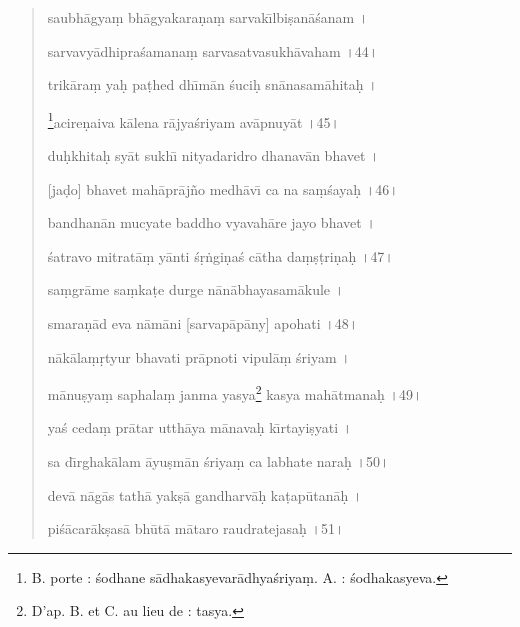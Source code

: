 \documentclass[a4paper, 11pt, oneside, french]{article}
\begin{document}
\begin{quotation}
saubh\={a}gya\d{m} bh\={a}gyakara\d{n}a\d{m} sarvak\={\i}lbi\d{s}an\={a}\'{s}anam \texthindi{।}

sarvavy\={a}dhipra\'{s}amana\d{m} sarvasatvasukh\={a}vaham \texthindi{।}44\texthindi{।}

\bigskip

trik\={a}ra\d{m} ya\d{h} pa\d{t}hed dh\={\i}m\={a}n \'{s}uci\d{h} sn\={a}nasam\={a}hita\d{h} \texthindi{।}

\footnote{B. porte : \'{s}odhane s\={a}dhakasyevar\={a}dhya\'{s}riya\d{m}. A. : \'{s}odhakasyeva.}acire\d{n}aiva k\={a}lena r\={a}jya\'{s}riyam av\={a}pnuy\={a}t \texthindi{।}45\texthindi{।}

\bigskip

du\d{h}khita\d{h} sy\={a}t sukh\={\i} nityadaridro dhanav\={a}n bhavet \texthindi{।}

[ja\d{d}o] bhavet mah\={a}pr\={a}j\~{n}o medh\={a}v\={\i} ca na sa\d{m}\'{s}aya\d{h} \texthindi{।}46\texthindi{।}

\bigskip

bandhan\={a}n mucyate baddho vyavah\={a}re jayo bhavet \texthindi{।}

\'{s}atravo mitrat\={a}\d{m} y\={a}nti \'{s}\d{r}\.{n}gi\d{n}a\'{s} c\={a}tha da\d{m}\d{s}\d{t}ri\d{n}a\d{h} \texthindi{।}47\texthindi{।}

\bigskip

sa\d{m}gr\={a}me sa\d{m}ka\d{t}e durge n\={a}n\={a}bhayasam\={a}kule \texthindi{।}

smara\d{n}\={a}d eva n\={a}m\={a}ni [sarvap\={a}p\={a}ny] apohati \texthindi{।}48\texthindi{।}

\bigskip

n\={a}k\={a}la\d{m}\d{r}tyur bhavati pr\={a}pnoti vipul\={a}\d{m} \'{s}riyam \texthindi{।}

m\={a}nu\d{s}ya\d{m} saphala\d{m} janma yasya\footnote{D'ap. B. et C. au lieu de : tasya.} kasya mah\={a}tmana\d{h} \texthindi{।}49\texthindi{।}

\bigskip

ya\'{s} ceda\d{m} pr\={a}tar utth\={a}ya m\={a}nava\d{h} k\={\i}rtayi\d{s}yati \texthindi{।}

sa d\={\i}rghak\={a}lam \={a}yu\d{s}m\={a}n \'{s}riya\d{m} ca labhate nara\d{h} \texthindi{।}50\texthindi{।}

\bigskip

dev\={a} n\={a}g\={a}s tath\={a} yak\d{s}\={a} gandharv\={a}\d{h} ka\d{t}ap\={u}tan\={a}\d{h} \texthindi{।}

pi\'{s}\={a}car\={a}k\d{s}as\={a} bh\={u}t\={a} m\={a}taro raudratejasa\d{h} \texthindi{।}51\texthindi{।}


\end{quotation}
\end{document}
